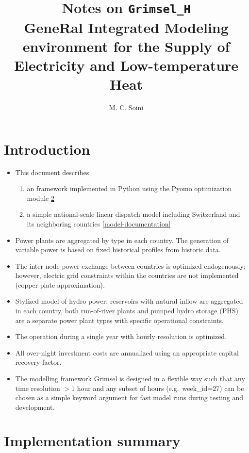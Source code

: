 \documentclass[]{article}
\title{
	Notes on \texttt{Grimsel\_H}\\
	\large GeneRal Integrated Modeling environment for the Supply of
	Electricity and Low-temperature Heat
}
\author{M. C. Soini}
\begin{document}
\maketitle

\tableofcontents

\section{Introduction}\label{introduction}
 
 

\begin{itemize}
\itemsep1pt\parskip0pt
\item This document describes
	\begin{enumerate}
		\item an  framework implemented in Python using the Pyomo optimization module \ref{implementation_summary}
		\item a simple national-scale linear dispatch model including Switzerland and its neighboring countries \ref{model-documentation}
	\end{enumerate}
\item Power plants are aggregated by type in each country. The generation of
  variable power is based on fixed historical profiles from historic
  data.
\item The inter-node power exchange between countries is optimized endogenously; however, electric grid constraints within the countries are not implemented (copper plate approximation).
\item Stylized model of hydro power: reservoirs with natural inflow are aggregated in each country, both run-of-river plants and pumped hydro storage (PHS) are a separate power plant types with specific operational constraints.
\item The operation during a single year with hourly resolution is optimized.
\item All over-night investment costs are annualized using an appropriate capital recovery factor.
\item The modelling framework Grimsel is designed in a flexible way such that any time resolution $>1$ hour and any subset of hours (e.g.~week\_id=27) can be chosen as a simple keyword argument for fast model runs during testing and development.
\end{itemize}


\section{Implementation summary}\label{implementation_summary}
\end{document}
